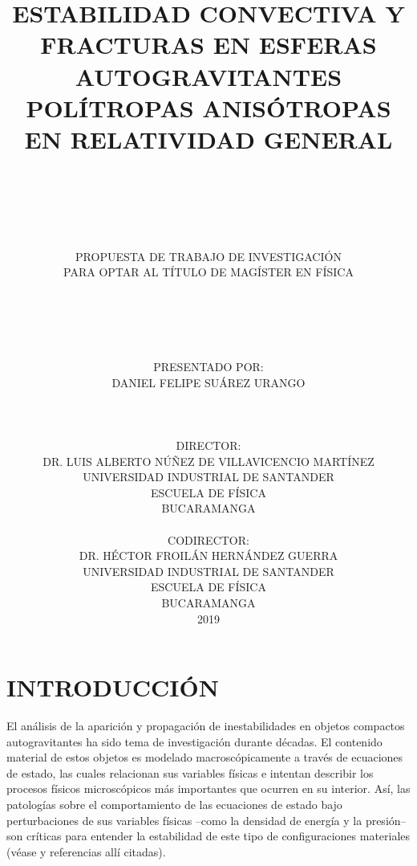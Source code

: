 \documentclass[letterpaper,11pt]{article}
\begin{document}
\title{\textbf{ESTABILIDAD CONVECTIVA Y FRACTURAS EN ESFERAS AUTOGRAVITANTES POLÍTROPAS ANISÓTROPAS EN RELATIVIDAD GENERAL}}
\author{ \\ \\ \\ \\ \\ 
{PROPUESTA DE TRABAJO DE INVESTIGACIÓN} \\
{PARA OPTAR AL TÍTULO DE MAGÍSTER EN FÍSICA} \\ \\ \\ \\ \\ \\
{PRESENTADO POR:} \\
{DANIEL FELIPE SUÁREZ URANGO} \\ \\ \\ \\ 
{DIRECTOR:} \\
{DR. LUIS ALBERTO NÚÑEZ DE VILLAVICENCIO MARTÍNEZ} \\ 
{UNIVERSIDAD INDUSTRIAL DE SANTANDER} \\
{ESCUELA DE FÍSICA} \\
{BUCARAMANGA} \\ \\
{CODIRECTOR:} \\
{DR. HÉCTOR FROILÁN HERNÁNDEZ GUERRA } \\ 
{UNIVERSIDAD INDUSTRIAL DE SANTANDER} \\
{ESCUELA DE FÍSICA} \\
{BUCARAMANGA} \\
{2019}
}

\date{}

\maketitle

\newpage 


\section{INTRODUCCIÓN}


El análisis de la aparición y propagación de inestabilidades en objetos compactos autogravitantes ha sido tema de investigación durante décadas. El contenido material de estos objetos es modelado  macroscópicamente a través de  ecuaciones de estado, las cuales relacionan sus variables físicas e intentan describir los procesos físicos microscópicos más importantes que ocurren en su interior.  Así, las patologías sobre el comportamiento de las ecuaciones de estado bajo perturbaciones de sus variables físicas --como la densidad de energía y la presión-- son críticas para entender la estabilidad de este tipo de configuraciones materiales (véase \cite{friedman2014instabilities} y referencias allí citadas). 
\end{document}
